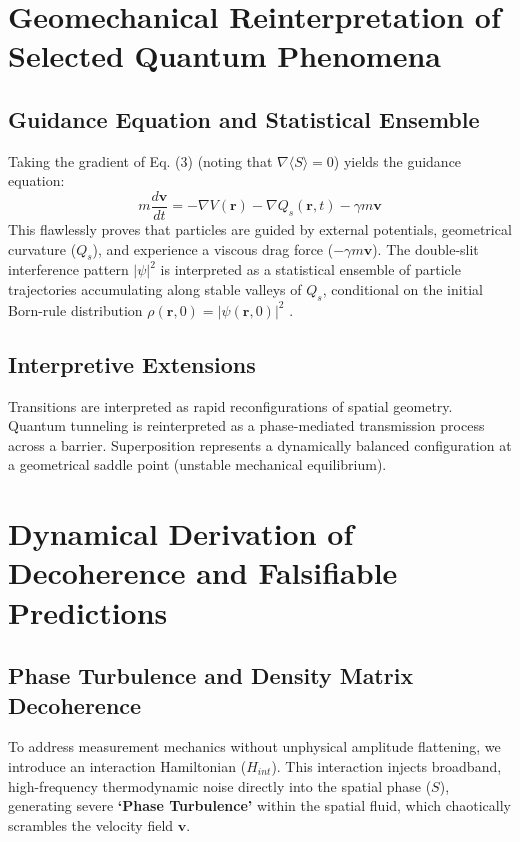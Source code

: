 \documentclass[reprint,amsmath,amssymb,aps,prd]{revtex4-2}
\begin{document}
\section{Geomechanical Reinterpretation of Selected Quantum Phenomena}

\subsection{Guidance Equation and Statistical Ensemble}
Taking the gradient of Eq. (3) (noting that $\nabla \langle S \rangle = 0$) yields the guidance equation:
\begin{equation}
m \frac{d\mathbf{v}}{dt} = -\nabla V(\mathbf{r}) - \nabla Q_s(\mathbf{r}, t) - \gamma m \mathbf{v}
\end{equation}
This flawlessly proves that particles are guided by external potentials, geometrical curvature ($Q_s$), and experience a viscous drag force ($-\gamma m \mathbf{v}$). The double-slit interference pattern $|\psi|^2$ is interpreted as a statistical ensemble of particle trajectories accumulating along stable valleys of $Q_s$, conditional on the initial Born-rule distribution $\rho(\mathbf{r},0) = |\psi(\mathbf{r},0)|^2$ \cite{Couder2006}.

\subsection{Interpretive Extensions}
Transitions are interpreted as rapid reconfigurations of spatial geometry. Quantum tunneling is reinterpreted as a phase-mediated transmission process across a barrier. Superposition represents a dynamically balanced configuration at a geometrical saddle point (unstable mechanical equilibrium). 

\section{Dynamical Derivation of Decoherence and Falsifiable Predictions}

\subsection{Phase Turbulence and Density Matrix Decoherence}
To address measurement mechanics without unphysical amplitude flattening, we introduce an interaction Hamiltonian ($H_{int}$). This interaction injects broadband, high-frequency thermodynamic noise directly into the spatial phase ($S$), generating severe \textbf{`Phase Turbulence'} within the spatial fluid, which chaotically scrambles the velocity field $\mathbf{v}$. 
\end{document}
